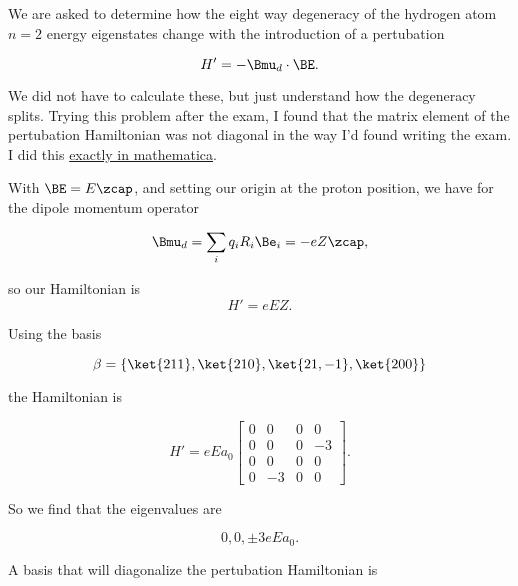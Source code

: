 We are asked to determine how the eight way degeneracy of the hydrogen atom $n=2$ energy eigenstates change with the introduction of a pertubation

\begin{equation}\label{eqn:qmTwoExamReflection:n}
H' = -\Bmu_d \cdot \BE.
\end{equation}

We did not have to calculate these, but just understand how the degeneracy splits.  Trying this problem after the exam, I found that the matrix element of the pertubation Hamiltonian was not diagonal in the way I'd found writing the exam.  I did this \href{https://github.com/peeterjoot/physicsplay/blob/master/notes/phy456/qmTwoExamReflection.cdf}{exactly in mathematica}.

With $\BE = E \zcap$, and setting our origin at the proton position, we have for the dipole momentum operator

\begin{equation}\label{eqn:qmTwoExamReflection:n}
\Bmu_d = \sum_i q_i R_i \Be_i = - e Z \zcap,
\end{equation}

so our Hamiltonian is
\begin{equation}\label{eqn:qmTwoExamReflection:n}
H' = e E Z.
\end{equation}

Using the basis

\begin{equation}\label{eqn:qmTwoExamReflection:n}
\beta = \{ 
\ket{211}, \ket{210}, \ket{21,-1}, \ket{200}
\}
\end{equation}

the Hamiltonian is

\begin{equation}\label{eqn:qmTwoExamReflection:n}
H' = 
e E a_0
\begin{bmatrix}
 0 & 0 & 0 & 0 \\
 0 & 0 & 0 & -3 \\
 0 & 0 & 0 & 0 \\
 0 & -3 & 0 & 0 
\end{bmatrix}.
\end{equation}

So we find that the eigenvalues are

\begin{equation}\label{eqn:qmTwoExamReflection:n}
0, 0, \pm 3 e E a_0.
\end{equation}

A basis that will diagonalize the pertubation Hamiltonian is

